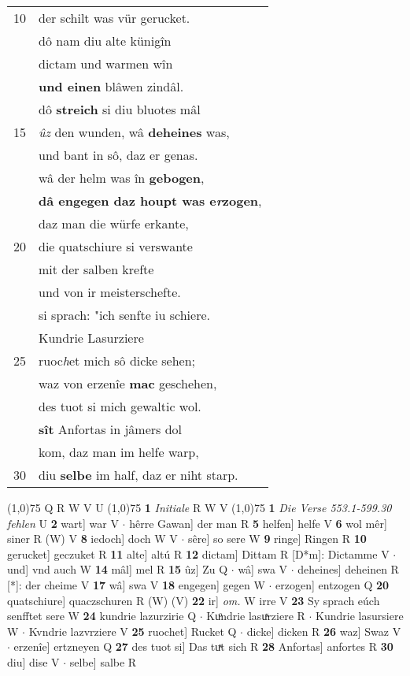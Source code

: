 \documentclass[8pt,a4paper,notitlepage]{article}
\begin{document}
\begin{table}[ht]
\begin{minipage}[t]{0.5\linewidth}
\begin{tabular}{rl}
10 & der schilt was vür gerucket.\\ 
 & dô nam diu alte künigîn\\ 
 & dictam und warmen wîn\\ 
 & \textbf{und einen} blâwen zindâl.\\ 
 & dô \textbf{streich} si diu bluotes mâl\\ 
15 & \textit{ûz} den wunden, wâ \textbf{deheines} was,\\ 
 & und bant in sô, daz er genas.\\ 
 & wâ der helm was în \textbf{gebogen},\\ 
 & \textbf{dâ engegen daz houpt was e\textit{r}zogen},\\ 
 & daz man die würfe erkante,\\ 
20 & die quatschiure si verswante\\ 
 & mit der salben krefte\\ 
 & und von ir meisterschefte.\\ 
 & si sprach: "ich senfte iu schiere.\\ 
 & Kundrie Lasurziere\\ 
25 & ruoc\textit{h}et mich sô dicke sehen;\\ 
 & waz von erzenîe \textbf{mac} geschehen,\\ 
 & des tuot si mich gewaltic wol.\\ 
 & \textbf{sît} Anfortas in jâmers dol\\ 
 & kom, daz man im helfe warp,\\ 
30 & diu \textbf{selbe} im half, daz er niht starp.\\ 
\end{tabular}
\scriptsize
\line(1,0){75} \newline
Q R W V U \newline
\line(1,0){75} \newline
\textbf{1} \textit{Initiale} R W V  \newline
\line(1,0){75} \newline
\textbf{1} \textit{Die Verse 553.1-599.30 fehlen} U  \textbf{2} wart] war V  $\cdot$ hêrre Gawan] der man R \textbf{5} helfen] helfe V \textbf{6} wol mêr] siner R (W) V \textbf{8} iedoch] doch W V  $\cdot$ sêre] so sere W \textbf{9} ringe] Ringen R \textbf{10} gerucket] geczuket R \textbf{11} alte] altú R \textbf{12} dictam] Dittam R [D*m]: Dictamme V  $\cdot$ und] vnd auch W \textbf{14} mâl] mel R \textbf{15} ûz] Zu Q  $\cdot$ wâ] swa V  $\cdot$ deheines] deheinen R [*]: der cheime V \textbf{17} wâ] swa V \textbf{18} engegen] gegen W  $\cdot$ erzogen] entzogen Q \textbf{20} quatschiure] quaczschuren R (W) (V) \textbf{22} ir] \textit{om.} W irre V \textbf{23} Sy sprach eúch senfftet sere W \textbf{24} kundrie lazurzirie Q  $\cdot$ Kuͦndrie lasuͯrziere R  $\cdot$ Kundrie lasursiere W  $\cdot$ Kvndrie lazvrziere V \textbf{25} ruochet] Rucket Q  $\cdot$ dicke] dicken R \textbf{26} waz] Swaz V  $\cdot$ erzenîe] ertzneyen Q \textbf{27} des tuot si] Das tuͯt sich R \textbf{28} Anfortas] anfortes R \textbf{30} diu] dise V  $\cdot$ selbe] salbe R \newline
\end{minipage}
\end{table}
\end{document}
